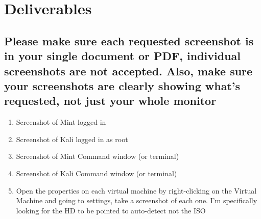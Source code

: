 \documentclass[12pt]{article}
\begin{document}
\section*{Deliverables}
\subsection*{Please make sure each requested screenshot is in your single document or PDF, individual screenshots are not accepted.  Also, make sure your screenshots are clearly showing what's requested, not just your whole monitor}
    \begin{enumerate}
        \item Screenshot of Mint logged in
        \item Screenshot of Kali logged in as root
        \item Screenshot of Mint Command window (or terminal)
        \item Screenshot of Kali Command window (or terminal)
        \item Open the properties on each virtual machine by right-clicking on the Virtual Machine and going to settings, take a screenshot of each one. I'm specifically looking for the HD to be pointed to auto-detect not the ISO


    \end{enumerate}
\end{document}

